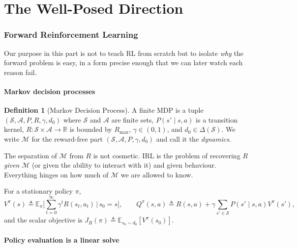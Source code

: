 \documentclass[11pt]{article}
\theoremstyle{plain}
\theoremstyle{definition}
\newtheorem{definition}[theorem]{Definition}
\theoremstyle{remark}
\renewcommand{\S}{\mathcal{S}}
\newcommand{\A}{\mathcal{A}}
\newcommand{\E}{\mathbb{E}}
\newcommand{\R}{\mathbb{R}}
\begin{document}
\clearpage

\part{The Well-Posed Direction}\label{part:wellposed}

\section{Forward Reinforcement Learning}

Our purpose in this part is not to teach RL from scratch but to isolate
\emph{why} the forward problem is easy, in a form precise enough that we
can later watch each reason fail.

\subsection{Markov decision processes}

\begin{definition}[Markov Decision Process]
A finite MDP is a tuple $(\S,\A,P,R,\gamma,d_0)$ where $\S$ and $\A$ are
finite sets, $P(s'\mid s,a)$ is a transition kernel, $R:\S\times\A\to\R$ is
bounded by $R_{\max}$, $\gamma\in(0,1)$, and $d_0\in\Delta(\S)$. We write
$\mathcal{M}$ for the reward-free part $(\S,\A,P,\gamma,d_0)$ and call it
the \emph{dynamics}.
\end{definition}

The separation of $\mathcal{M}$ from $R$ is not cosmetic. IRL is the
problem of recovering $R$ \emph{given} $\mathcal{M}$ (or given the ability
to interact with it) and given behaviour. Everything hinges on how much of
$\mathcal{M}$ we are allowed to know.

For a stationary policy $\pi$,
\begin{equation}
V^\pi(s) \triangleq \E_\pi\Big[\sum_{t=0}^\infty \gamma^t R(s_t,a_t) \,\Big|\, s_0=s\Big],
\qquad
Q^\pi(s,a) \triangleq R(s,a) + \gamma\sum_{s'\in\S} P(s'\mid s,a)V^\pi(s'),
\label{eq:vqdef}
\end{equation}
and the scalar objective is $J_R(\pi) \triangleq \E_{s_0\sim d_0}[V^\pi(s_0)]$.

\subsection{Policy evaluation is a linear solve}
\end{document}
